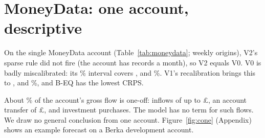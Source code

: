 \section{MoneyData: one account, descriptive}
\label{app:moneydata}
On the single MoneyData account (Table~\ref{tab:moneydata};
 weekly origins), V2's sparse rule did not fire
(the account has  records a month), so V2
equals V0. V0 is badly miscalibrated: its \lC\% interval covers
,  and
\%. V1's recalibration brings this to
,  and
\%, and B-EQ has the lowest CRPS.

About \% of the account's gross flow is one-off:
inflows of up to \pounds{}, an account transfer of
\pounds{}, and investment purchases. The model has no term
for such flows. We draw no general conclusion from one account.
Figure~\ref{fig:cone} (Appendix) shows an example forecast on a Berka
development account.

\begin{table}[htbp]
\centering\footnotesize
{}
\caption{MoneyData, one account,  weekly
origins: point estimates only, because one account cannot be bootstrapped
by account. Skill is the pooled ratio over the account's origins. V2's
sparse rule never fired, so V2 equals V0.}
\label{tab:moneydata}
\end{table}

